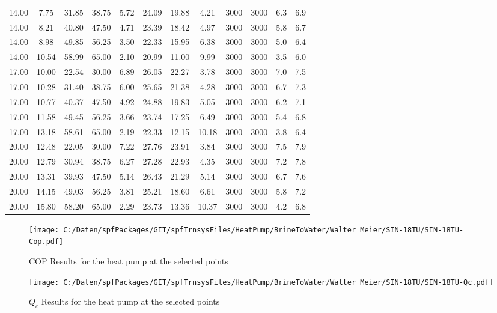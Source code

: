 \documentclass[english]{SPFShortReport}
\begin{document}
\begin{table}[!ht]
\begin{small}
\begin{center}
{\begin{tabular}{l | c c c c c c c c c c c }
14.00 & 7.75 & 31.85 & 38.75 & 5.72 & 24.09 & 19.88 & 4.21 & 3000 & 3000 & 6.3 & 6.9\\ 
14.00 & 8.21 & 40.80 & 47.50 & 4.71 & 23.39 & 18.42 & 4.97 & 3000 & 3000 & 5.8 & 6.7\\ 
14.00 & 8.98 & 49.85 & 56.25 & 3.50 & 22.33 & 15.95 & 6.38 & 3000 & 3000 & 5.0 & 6.4\\ 
14.00 & 10.54 & 58.99 & 65.00 & 2.10 & 20.99 & 11.00 & 9.99 & 3000 & 3000 & 3.5 & 6.0\\ 
17.00 & 10.00 & 22.54 & 30.00 & 6.89 & 26.05 & 22.27 & 3.78 & 3000 & 3000 & 7.0 & 7.5\\ 
17.00 & 10.28 & 31.40 & 38.75 & 6.00 & 25.65 & 21.38 & 4.28 & 3000 & 3000 & 6.7 & 7.3\\ 
17.00 & 10.77 & 40.37 & 47.50 & 4.92 & 24.88 & 19.83 & 5.05 & 3000 & 3000 & 6.2 & 7.1\\ 
17.00 & 11.58 & 49.45 & 56.25 & 3.66 & 23.74 & 17.25 & 6.49 & 3000 & 3000 & 5.4 & 6.8\\ 
17.00 & 13.18 & 58.61 & 65.00 & 2.19 & 22.33 & 12.15 & 10.18 & 3000 & 3000 & 3.8 & 6.4\\ 
20.00 & 12.48 & 22.05 & 30.00 & 7.22 & 27.76 & 23.91 & 3.84 & 3000 & 3000 & 7.5 & 7.9\\ 
20.00 & 12.79 & 30.94 & 38.75 & 6.27 & 27.28 & 22.93 & 4.35 & 3000 & 3000 & 7.2 & 7.8\\ 
20.00 & 13.31 & 39.93 & 47.50 & 5.14 & 26.43 & 21.29 & 5.14 & 3000 & 3000 & 6.7 & 7.6\\ 
20.00 & 14.15 & 49.03 & 56.25 & 3.81 & 25.21 & 18.60 & 6.61 & 3000 & 3000 & 5.8 & 7.2\\ 
20.00 & 15.80 & 58.20 & 65.00 & 2.29 & 23.73 & 13.36 & 10.37 & 3000 & 3000 & 4.2 & 6.8\\ 
\hline
\hline
\end{tabular}
}
\label{ResultsTable}
\end{center}
\end{small}
\end{table}
\begin{figure}[!ht]
\begin{center}
\texttt{[image: C:/Daten/spfPackages/GIT/spfTrnsysFiles/HeatPump/BrineToWater/Walter Meier/SIN-18TU/SIN-18TU-Cop.pdf]}
\caption{COP Results for the heat pump at the selected points}
\label{COPFig}
\end{center}
\end{figure}
\begin{figure}[!ht]
\begin{center}
\texttt{[image: C:/Daten/spfPackages/GIT/spfTrnsysFiles/HeatPump/BrineToWater/Walter Meier/SIN-18TU/SIN-18TU-Qc.pdf]}
\caption{$Q_c$ Results for the heat pump at the selected points}
\label{QcFig}
\end{center}
\end{figure}
\end{document}
